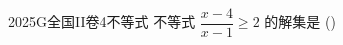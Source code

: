 
\begin{problem}{2025}{G}{全国II卷}{4}{不等式}
不等式 $\dfrac{x-4}{x-1} \geqslant 2$ 的解集是
(\hspace{1cm})
\begin{choices}
\end{choices}
\end{problem}